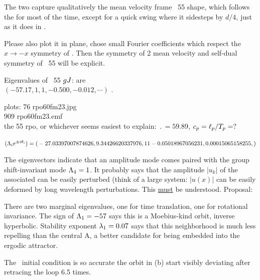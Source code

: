 The two {\eqva}
capture qualitatively the mean velocity frame \rpo\ {\nameit}55 shape,
which follows the
{\eqv} for most of the time, except for a quick swing where it
sidesteps by $d/4$, just as it does in .

Please also plot it in plane, chose small Fourier coefficients
 which respect the $x \to -x$ symmetry of \KSe.
Then the symmetry of 2 mean velocity
{\eqva} and self-dual symmetry of \rpo\ {\nameit}55 will be explicit.

Eigenvalues of \rpo\ {\nameit}55 $g\jMps$: are
\\
$(-57.17,  1, 1, -0.500, -0.012, \cdots)$ .
%

plots:
  76 rpo60fm23.jpg  \\
 909 rpo60fm23.emf  \\
the 55 rpo, or whichever seems easiest to explain:
$\period{} = 59.89$,
$c_p = \shift_p/\period{p}= ?$

$(\ExpaEig_i e^{\pm i\theta_i})=
(
\\
 -27.03397007874626,
\\
   9.34426620337976,
\\
   1
\\
   1
\\
  -0.05018967056231,
\\
   0.00015065158255,
)$

The eigenvectors
indicate that an amplitude mode comes paired with the
group shift-invariant mode $\ExpaEig_4 =1$. It probably says that
the amplitude $|u_k|$ of the associated can be easily perturbed (think of
a large system: $|u(x)|$ can be easily deformed by long wavelength
perturbations. This \underline{must} be understood. Proposal:

There are two
marginal eigenvalues, one for time translation, one for
rotational invariance.
The sign of $\ExpaEig_{1}=-57$ says this is a Moebius-kind orbit,
inverse hyperbolic.
Stability exponent
 $\eigExp[1]=0.07$ says that this neighborhood is much less repelling than
the central {\eqv} A, a better candidate for being embedded into the
ergodic attractor.

The \rpo\ initial condition is
so accurate the orbit in (b)
start visibly deviating after retracing the loop 6.5 times.

